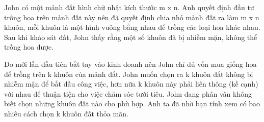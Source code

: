 John có một mảnh đất hình chữ nhật kích thước m x n. Anh quyết định đầu tư trồng hoa trên mảnh đất này nên đã quyết định chia nhỏ mảnh đất ra làm m x n khuôn, mỗi khuôn là một hình vuông bằng nhau để trồng các loại hoa khác nhau. Sau khi khảo sát đất, John thấy rằng một số khuôn đã bị nhiễm mặn, không thể trồng hoa được.  

   Do mới lần đầu tiên bắt tay vào kinh doanh nên John chỉ đủ vốn mua giống hoa để trồng trên k khuôn của mảnh đất. John muốn chọn ra k khuôn đất không bị nhiễm mặn để bắt đầu công việc, hơn nữa k khuôn này phải liên thông (kề cạnh) với nhau để thuận tiện cho việc chăm sóc tưới tiêu. John đang phân vân không biết chọn những khuôn đất nào cho phù hợp. Anh ta đã nhờ bạn tính xem có bao nhiêu cách chọn k khuôn đất thỏa mãn.